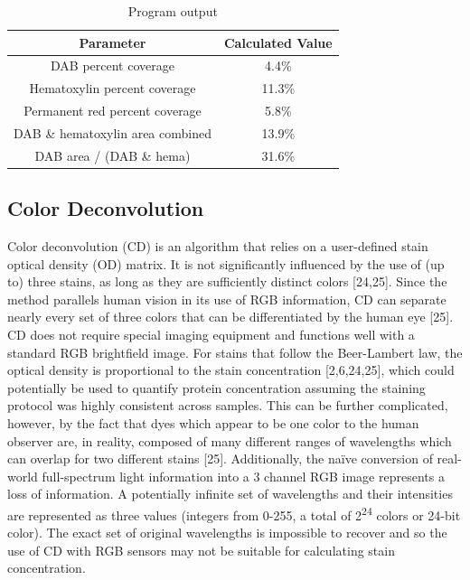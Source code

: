 \documentclass[12pt]{article}
\begin{document}
\begin{table}[H]
\centering
\caption{Program output}
\label{program output}
\begin{tabular}{|c|c|}
\hline
\textbf{Parameter}               & \textbf{Calculated Value} \\ \hline
DAB percent coverage             & 4.4\%                     \\ \hline
Hematoxylin percent coverage     & 11.3\%                    \\ \hline
Permanent red percent coverage   & 5.8\%                     \\ \hline
DAB \& hematoxylin area combined & 13.9\%                    \\ \hline
DAB area / (DAB \& hema)                         & 31.6\%                    \\ \hline
\end{tabular}
\end{table}


\subsection*{Color Deconvolution}

Color deconvolution (CD) is an algorithm that relies on a user-defined stain optical density (OD) matrix. It is not significantly influenced by the use of (up to) three stains, as long as they are sufficiently distinct colors [24,25]. Since the method parallels human vision in its use of RGB information, CD can separate nearly every set of three colors that can be differentiated by the human eye [25]. CD does not require special imaging equipment and functions well with a standard RGB brightfield image. For stains that follow the Beer-Lambert law, the optical density is proportional to the stain concentration [2,6,24,25], which could potentially be used to quantify protein concentration assuming the staining protocol was highly consistent across samples. This can be further complicated, however, by the fact that dyes which appear to be one color to the human observer are, in reality, composed of many different ranges of wavelengths which can overlap for two different stains [25]. Additionally, the naïve conversion of real-world full-spectrum light information into a 3 channel RGB image represents a loss of information. A potentially infinite set of wavelengths and their intensities are represented as three values (integers from 0-255, a total of 2\textsuperscript{24} colors or 24-bit color). The exact set of original wavelengths is impossible to recover and so the use of CD with RGB sensors may not be suitable for calculating stain concentration.
\end{document}
